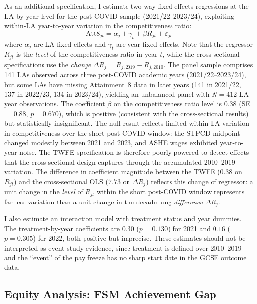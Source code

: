 \documentclass[12pt]{article}
\begin{document}
As an additional specification, I estimate two-way fixed effects regressions at the LA-by-year level for the post-COVID sample (2021/22--2023/24), exploiting within-LA year-to-year variation in the competitiveness ratio:
\begin{equation}
\text{Att8}_{jt} = \alpha_j + \gamma_t + \beta R_{jt} + \varepsilon_{jt}
\end{equation}
where $\alpha_j$ are LA fixed effects and $\gamma_t$ are year fixed effects. Note that the regressor $R_{jt}$ is the \textit{level} of the competitiveness ratio in year $t$, while the cross-sectional specifications use the \textit{change} $\Delta R_j = R_{j,2019} - R_{j,2010}$. The panel sample comprises 141 LAs observed across three post-COVID academic years (2021/22--2023/24), but some LAs have missing Attainment~8 data in later years (141 in 2021/22, 137 in 2022/23, 134 in 2023/24), yielding an unbalanced panel with $N = 412$ LA-year observations. The coefficient $\beta$ on the competitiveness ratio level is $0.38$ (SE $= 0.88$, $p = 0.670$), which is positive (consistent with the cross-sectional results) but statistically insignificant. The null result reflects limited within-LA variation in competitiveness over the short post-COVID window: the STPCD midpoint changed modestly between 2021 and 2023, and ASHE wages exhibited year-to-year noise. The TWFE specification is therefore poorly powered to detect effects that the cross-sectional design captures through the accumulated 2010--2019 variation. The difference in coefficient magnitude between the TWFE ($0.38$ on $R_{jt}$) and the cross-sectional OLS ($7.73$ on $\Delta R_j$) reflects this change of regressor: a unit change in the \textit{level} of $R_{jt}$ within the short post-COVID window represents far less variation than a unit change in the decade-long \textit{difference} $\Delta R_j$.

I also estimate an interaction model with treatment status and year dummies. The treatment-by-year coefficients are $0.30$ ($p = 0.130$) for 2021 and $0.16$ ($p = 0.305$) for 2022, both positive but imprecise. These estimates should not be interpreted as event-study evidence, since treatment is defined over 2010--2019 and the ``event'' of the pay freeze has no sharp start date in the GCSE outcome data.

\subsection{Equity Analysis: FSM Achievement Gap}
\end{document}
